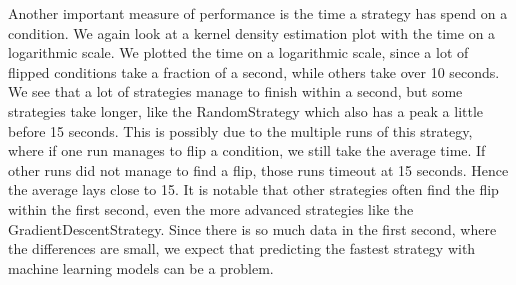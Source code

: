 Another important measure of performance is the time a strategy has spend on a condition. We again look at a kernel density estimation plot with the time on a logarithmic scale. We plotted the time on a logarithmic scale, since a lot of flipped conditions take a fraction of a second, while others take over 10 seconds.
We see that a lot of strategies manage to finish within a second, but some strategies take longer, like the RandomStrategy which also has a peak a little before 15 seconds. This is possibly due to the multiple runs of this strategy, where if one run manages to flip a condition, we still take the average time. If other runs did not manage to find a flip, those runs timeout at 15 seconds. Hence the average lays close to 15. It is notable that other strategies often find the flip within the first second, even the more advanced strategies like the GradientDescentStrategy.
Since there is so much data in the first second, where the differences are small, we expect that predicting the fastest strategy with machine learning models can be a problem.


